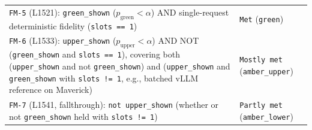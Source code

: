 \documentclass[11pt,letterpaper]{article}
\begin{document}
{\begin{longtable}{@{}>{\raggedright\arraybackslash}p{} >{\raggedright\arraybackslash}p{}@{}}
\texttt{FM-5} (L1521): \texttt{green\_\allowbreak{}shown} ($p_{\text{green}} < \alpha$) AND single-request deterministic fidelity (\texttt{slots == 1}) & \texttt{Met} (\texttt{green}) \\
\texttt{FM-6} (L1533): \texttt{upper\_\allowbreak{}shown} ($p_{\text{upper}} < \alpha$) AND NOT (\texttt{green\_\allowbreak{}shown} and \texttt{slots == 1}), covering both (\texttt{upper\_\allowbreak{}shown} and not \texttt{green\_\allowbreak{}shown}) and (\texttt{upper\_\allowbreak{}shown} and \texttt{green\_\allowbreak{}shown} with \texttt{slots != 1}, e.g., batched vLLM reference on Maverick) & \texttt{Mostly met} (\texttt{amber\_\allowbreak{}upper}) \\
\texttt{FM-7} (L1541, fallthrough): \texttt{not upper\_\allowbreak{}shown} (whether or not \texttt{green\_\allowbreak{}shown} held with \texttt{slots != 1}) & \texttt{Partly met} (\texttt{amber\_\allowbreak{}lower}) \\
\end{longtable}
}
\end{document}
